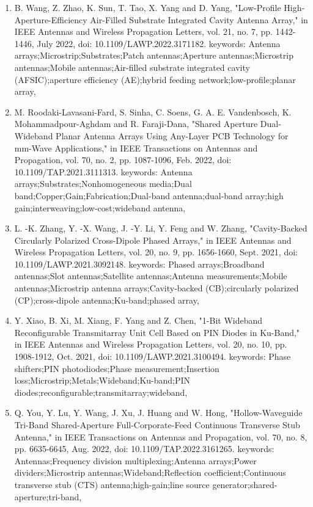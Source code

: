 \documentclass[12pt]{article}
\begin{document}
\begin{enumerate}
		\item B. Wang, Z. Zhao, K. Sun, T. Tao, X. Yang and D. Yang, "Low-Profile High-Aperture-Efficiency Air-Filled Substrate Integrated Cavity Antenna Array," in IEEE Antennas and Wireless Propagation Letters, vol. 21, no. 7, pp. 1442-1446, July 2022, doi: 10.1109/LAWP.2022.3171182.
keywords: {Antenna arrays;Microstrip;Substrates;Patch antennas;Aperture antennas;Microstrip antennas;Mobile antennas;Air-filled substrate integrated cavity (AFSIC);aperture efficiency (AE);hybrid feeding network;low-profile;planar array},

		\item M. Roodaki-Lavasani-Fard, S. Sinha, C. Soens, G. A. E. Vandenbosch, K. Mohammadpour-Aghdam and R. Faraji-Dana, "Shared Aperture Dual-Wideband Planar Antenna Arrays Using Any-Layer PCB Technology for mm-Wave Applications," in IEEE Transactions on Antennas and Propagation, vol. 70, no. 2, pp. 1087-1096, Feb. 2022, doi: 10.1109/TAP.2021.3111313.
keywords: {Antenna arrays;Substrates;Nonhomogeneous media;Dual band;Copper;Gain;Fabrication;Dual-band antenna;dual-band array;high gain;interweaving;low-cost;wideband antenna},

		\item L. -K. Zhang, Y. -X. Wang, J. -Y. Li, Y. Feng and W. Zhang, "Cavity-Backed Circularly Polarized Cross-Dipole Phased Arrays," in IEEE Antennas and Wireless Propagation Letters, vol. 20, no. 9, pp. 1656-1660, Sept. 2021, doi: 10.1109/LAWP.2021.3092148.
keywords: {Phased arrays;Broadband antennas;Slot antennas;Satellite antennas;Antenna measurements;Mobile antennas;Microstrip antenna arrays;Cavity-backed (CB);circularly polarized (CP);cross-dipole antenna;Ku-band;phased array},

		\item Y. Xiao, B. Xi, M. Xiang, F. Yang and Z. Chen, "1-Bit Wideband Reconfigurable Transmitarray Unit Cell Based on PIN Diodes in Ku-Band," in IEEE Antennas and Wireless Propagation Letters, vol. 20, no. 10, pp. 1908-1912, Oct. 2021, doi: 10.1109/LAWP.2021.3100494.
keywords: {Phase shifters;PIN photodiodes;Phase measurement;Insertion loss;Microstrip;Metals;Wideband;Ku-band;PIN diodes;reconfigurable;transmitarray;wideband},

		\item Q. You, Y. Lu, Y. Wang, J. Xu, J. Huang and W. Hong, "Hollow-Waveguide Tri-Band Shared-Aperture Full-Corporate-Feed Continuous Transverse Stub Antenna," in IEEE Transactions on Antennas and Propagation, vol. 70, no. 8, pp. 6635-6645, Aug. 2022, doi: 10.1109/TAP.2022.3161265.
keywords: {Antennas;Frequency division multiplexing;Antenna arrays;Power dividers;Microstrip antennas;Wideband;Reflection coefficient;Continuous transverse stub (CTS) antenna;high-gain;line source generator;shared-aperture;tri-band},


\end{enumerate}
\end{document}
